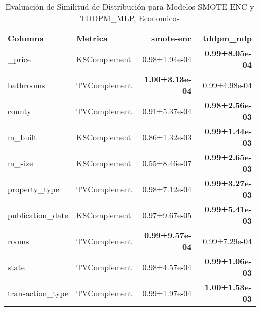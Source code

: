 \begin{table}[H]
\centering
\fontsize{10}{14}\selectfont
\caption{Evaluaci\'on de Similitud de Distribuci\'on para Modelos SMOTE-ENC y TDDPM\_MLP, Economicos}
\label{table-shape-economicos-b}
\begin{tabular}{|l|l|r|r|}
\hline
\rowcolor[gray]{0.8}
Columna & Metrica & smote-enc & tddpm\_mlp \\
\hline \_price & KSComplement & 0.98±1.94e-04 & \bfseries 0.99±8.05e-04 \\
\hline bathrooms & TVComplement & \bfseries 1.00±3.13e-04 & 0.99±4.98e-04 \\
\hline county & TVComplement & 0.91±5.37e-04 & \bfseries 0.98±2.56e-03 \\
\hline m\_built & KSComplement & 0.86±1.32e-03 & \bfseries 0.99±1.44e-03 \\
\hline m\_size & KSComplement & 0.55±8.46e-07 & \bfseries 0.99±2.65e-03 \\
\hline property\_type & TVComplement & 0.98±7.12e-04 & \bfseries 0.99±3.27e-03 \\
\hline publication\_date & KSComplement & 0.97±9.67e-05 & \bfseries 0.99±5.41e-03 \\
\hline rooms & TVComplement & \bfseries 0.99±9.57e-04 & 0.99±7.29e-04 \\
\hline state & TVComplement & 0.98±4.57e-04 & \bfseries 0.99±1.06e-03 \\
\hline transaction\_type & TVComplement & 0.99±1.97e-04 & \bfseries 1.00±1.53e-03 \\
\hline
\end{tabular}
\end{table}
